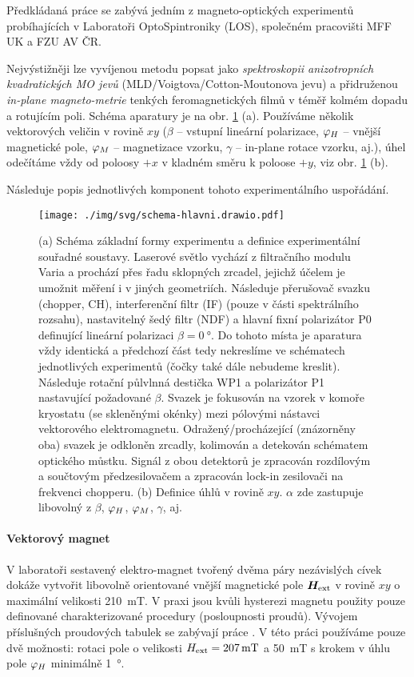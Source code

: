 Předkládaná práce se zabývá jedním z magneto-optických experimentů probíhajících v Laboratoři OptoSpintroniky (LOS), společném pracovišti MFF UK a FZU AV ČR.

Nejvýstižněji lze vyvíjenou metodu popsat jako \emph{spektroskopii anizotropních kvadratických MO jevů} (MLD/Voigtova/Cotton-Moutonova jevu) a přidruženou \emph{in-plane magneto-metrie} tenkých feromagnetických filmů v téměř kolmém dopadu a rotujícím poli.
Schéma aparatury je na obr. \ref{fig:zakladni-schema} (a).
Používáme několik vektorových veličin v rovině $xy$ ($\beta$ -- vstupní lineární polarizace, $\varphi_H$ -- vnější magnetické pole, $\varphi_M$ -- magnetizace vzorku, $\gamma$ -- in-plane rotace vzorku, aj.), úhel odečítáme vždy od poloosy $+x$ v kladném směru k poloose $+y$, viz obr. \ref{fig:zakladni-schema} (b).

Následuje popis jednotlivých komponent tohoto experimentálního uspořádání.

\begin{figure}[htbp]
    \centering
    \texttt{[image: ./img/svg/schema-hlavni.drawio.pdf]}
    \caption{(a) Schéma základní formy experimentu a definice experimentální souřadné soustavy.
    Laserové světlo vychází z filtračního modulu Varia a prochází přes řadu sklopných zrcadel, jejichž účelem je umožnit měření i v jiných geometriích.
Následuje přerušovač svazku (chopper, CH), interferenční filtr (IF) (pouze v části spektrálního rozsahu), nastavitelný šedý filtr (NDF) a hlavní fixní polarizátor P0 definující lineární polarizaci $\beta=\SI{0}{\degree}$.
Do tohoto místa je aparatura vždy identická a předchozí část tedy nekreslíme ve schématech jednotlivých experimentů (čočky také dále nebudeme kreslit).
Následuje rotační půlvlnná destička WP1 a polarizátor P1 nastavující požadované $\beta$.
Svazek je fokusován na vzorek v komoře kryostatu (se skleněnými okénky) mezi pólovými nástavci vektorového elektromagnetu.
Odražený/procházející (znázorněny oba) svazek je odkloněn zrcadly, kolimován a detekován schématem optického můstku.
Signál z obou detektorů je zpracován rozdílovým a součtovým předzesilovačem a zpracován lock-in zesilovači na frekvenci chopperu.
(b) Definice úhlů v rovině $xy$. $\alpha$ zde zastupuje libovolný z $\beta$, $\varphi_H$, $\varphi_M$, $\gamma$, aj.}
    \label{fig:zakladni-schema}
\end{figure}

\paragraph{Vektorový magnet}
V laboratoři sestavený elektro-magnet tvořený dvěma páry nezávislých cívek dokáže vytvořit libovolně orientované vnější magnetické pole $\bm{H}_\textrm{ext}$ v rovině $xy$ o maximální velikosti \SI{210}{\milli\tesla}.
V praxi jsou kvůli hysterezi magnetu použity pouze definované charakterizované procedury (posloupnosti proudů).
Vývojem příslušných proudových tabulek se zabývají práce \cite{kimakCharakterizaciaDvojdimenzionalnehoElektromagnetu2017,kimakOptickaSpektroskopieAntiferomagnetu2019}.
V této práci používáme pouze dvě možnosti: rotaci pole o velikosti $H_\textrm{ext}=\SI{207}{\milli\tesla}$ a \SI{50}{\milli\tesla} s krokem v úhlu pole $\varphi_H$ minimálně \SI{1}{\degree}.

